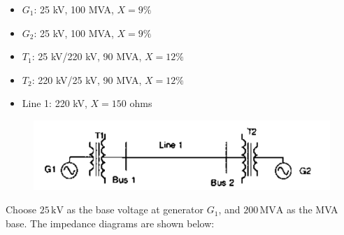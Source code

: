 \begin{itemize}
    \item $G_1$: 25 kV, 100 MVA, $X = 9\%$
    \item $G_2$: 25 kV, 100 MVA, $X = 9\%$
    \item $T_1$: 25 kV/220 kV, 90 MVA, $X = 12\%$
    \item $T_2$: 220 kV/25 kV, 90 MVA, $X = 12\%$
    \item Line 1: 220 kV, $X = 150$ ohms
\end{itemize}
\begin{figure}[!ht]
    \centering
    \includegraphics[scale=0.4]{GATE-yearwise/GATE(3)/figs/5q.png}
    \caption{}
    \label{fig:5q}
\end{figure}
\noindent Choose $25 \, \text{kV}$ as the base voltage at generator $G_1$, and $200 \, \text{MVA}$ as the MVA base. The impedance diagrams are shown below:
